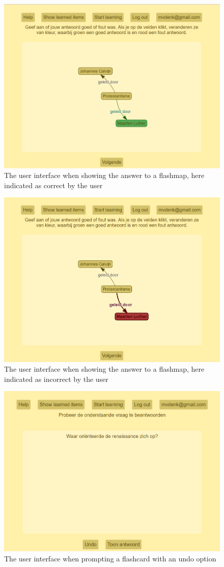 \begin{figure}
    \centering
    \includegraphics[width=.8\textwidth]{img/ui_fm_answer_correct.png}
    \caption{The user interface when showing the answer to a flashmap, here indicated as correct by the user}
    \label{fig:ui_fm_answer_correct}
\end{figure}

\begin{figure}
    \centering
    \includegraphics[width=.8\textwidth]{img/ui_fm_answer_incorrect.png}
    \caption{The user interface when showing the answer to a flashmap, here indicated as incorrect by the user}
    \label{fig:ui_fm_answer_incorrect}
\end{figure}

\begin{figure}
    \centering
    \includegraphics[width=.8\textwidth]{img/ui_undo.png}
    \caption{The user interface when prompting a flashcard with an undo option}
    \label{fig:ui_undo}
\end{figure}

